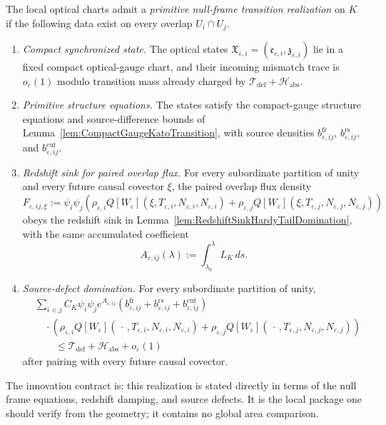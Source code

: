 \begin{definition}\label{def:PrimitiveNullFrameTransitionRealization}
The local optical charts admit a \emph{primitive null-frame transition realization} on $K$ if the following data exist on every overlap $U_i\cap U_j$.
\begin{enumerate}
    \item \emph{Compact synchronized state.} The optical states $\mathfrak X_{\varepsilon,i}=(\mathfrak e_{\varepsilon,i},\mathfrak z_{\varepsilon,i})$ lie in a fixed compact optical-gauge chart, and their incoming mismatch trace is $o_\varepsilon(1)$ modulo transition mass already charged by $\mathcal T_{\mathrm{def}}+\mathcal H_{\mathrm{abs}}$.
    \item \emph{Primitive structure equations.} The states satisfy the compact-gauge structure equations and source-difference bounds of Lemma~\ref{lem:CompactGaugeKatoTransition}, with source densities $b^{\mathrm{fr}}_{\varepsilon,ij}$, $b^{\mathrm{rs}}_{\varepsilon,ij}$, and $b^{\mathrm{cut}}_{\varepsilon,ij}$.
    \item \emph{Redshift sink for paired overlap flux.} For every subordinate partition of unity and every future causal covector $\xi$, the paired overlap flux density
    \[
        F_{\varepsilon,ij,\xi}
        :=
        \psi_i\psi_j
        \left(
            \rho_{\varepsilon,i}Q[W_\varepsilon](\xi,T_{\varepsilon,i},N_{\varepsilon,i},N_{\varepsilon,i})
            +
            \rho_{\varepsilon,j}Q[W_\varepsilon](\xi,T_{\varepsilon,j},N_{\varepsilon,j},N_{\varepsilon,j})
        \right)
    \]
    obeys the redshift sink in Lemma~\ref{lem:RedshiftSinkHardyTailDomination}, with the same accumulated coefficient
    \[
        A_{\varepsilon,ij}(\lambda):=\int_{\lambda_0}^{\lambda}L_K\,ds .
    \]
    \item \emph{Source-defect domination.} For every subordinate partition of unity,
    \[
    \begin{split}
        &\sum_{i<j}
        C_K\psi_i\psi_j
        e^{A_{\varepsilon,ij}}
        \left(
            b^{\mathrm{fr}}_{\varepsilon,ij}
            +
            b^{\mathrm{rs}}_{\varepsilon,ij}
            +
            b^{\mathrm{cut}}_{\varepsilon,ij}
        \right) \\
        &\quad\cdot
        \left(
            \rho_{\varepsilon,i}Q[W_\varepsilon](\,\cdot\,,T_{\varepsilon,i},N_{\varepsilon,i},N_{\varepsilon,i})
            +
            \rho_{\varepsilon,j}Q[W_\varepsilon](\,\cdot\,,T_{\varepsilon,j},N_{\varepsilon,j},N_{\varepsilon,j})
        \right) \\
        &\qquad\le
        \mathcal T_{\mathrm{def}}+\mathcal H_{\mathrm{abs}}+o_\varepsilon(1)
    \end{split}
    \]
    after pairing with every future causal covector.
\end{enumerate}
The innovation contract is: this realization is stated directly in terms of the null frame equations, redshift damping, and source defects.  It is the local package one should verify from the geometry; it contains no global area comparison.
\end{definition}

